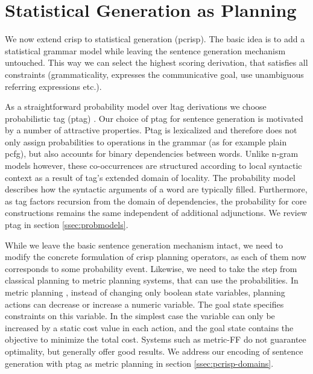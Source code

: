 \section{Statistical Generation as Planning}
\label{sec:pcrisp}

We now extend {\sc crisp} to statistical generation ({\sc pcrisp}). The basic idea is to add a statistical grammar model while leaving the sentence generation mechanism untouched. This way we can select the highest scoring derivation, that satisfies all constraints (grammaticality, expresses the communicative goal, use unambiguous referring expressions etc.). 

 As a straightforward probability model over {\sc ltag} derivations we choose probabilistic {\sc tag} ({\sc ptag}) \cite{resnik1992}.
Our choice of {\sc ptag} for sentence generation is motivated by a number of attractive properties.
 {\sc Ptag} is lexicalized and therefore does not only assign probabilities to operations in the grammar (as for example plain {\sc pcfg}), but also accounts for binary dependencies between words.  Unlike n-gram models however, these co-occurrences are structured according to local syntactic context as a result of {\sc tag}'s extended domain of locality. The probability model describes how the syntactic arguments of a word are typically filled. 
Furthermore, as {\sc tag} factors recursion from the domain of dependencies, the probability for core constructions remains the same independent of additional adjunctions. 
 We review {\sc ptag} in section \ref{ssec:probmodels}.

While we leave the basic sentence generation mechanism intact, we need to modify the concrete formulation of {\sc crisp} planning operators, as each of them now corresponds to some probability event. Likewise, we need to take the step from classical planning to metric planning systems, that can use the probabilities.
In metric planning \cite{fox2002}, instead of changing only boolean state variables, planning actions can decrease or increase a numeric variable. The goal state specifies constraints on this variable. In the simplest case the variable can only be increased by a static cost value in each action, and the goal state contains the objective to minimize the total cost. Systems such as metric-{\sc FF} \cite{hoffmann2003} do not guarantee optimality, but generally offer good results. We address our encoding of sentence generation with {\sc ptag} as metric planning in section \ref{ssec:pcrisp-domains}. 

